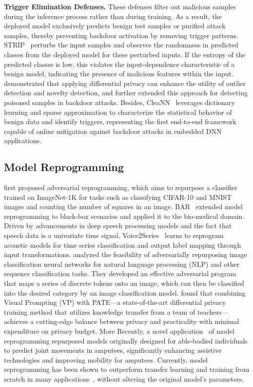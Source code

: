 \textbf{Trigger Elimination Defenses.}
These defenses filter out malicious samples during the inference process rather than during training. As a result, the deployed model exclusively predicts benign test samples or purified attack samples, thereby preventing backdoor activation by removing trigger patterns. STRIP~\citep{gao2019strip} perturbs the input samples and observes the randomness in predicted classes from the deployed model for these perturbed inputs. If the entropy of the predicted classes is low, this violates the input-dependence characteristic of a benign model, indicating the presence of malicious features within the input. \cite{du2020robust} demonstrated that applying differential privacy can enhance the utility of outlier detection and novelty detection, and further extended this approach for detecting poisoned samples in backdoor attacks. Besides, CleaNN~\citep{javaheripi2020cleann} leverages dictionary learning and sparse approximation to characterize the statistical behavior of benign data and identify triggers, representing the first end-to-end framework capable of online mitigation against backdoor attacks in embedded DNN applications.

\subsection{Model Reprogramming}

\citet{elsayed2019adversarial} first proposed adversarial reprogramming, which aims to repurpose a classifier trained on ImageNet-1K for tasks such as classifying CIFAR-10 and MNIST images and counting the number of squares in an image. BAR~\citep{tsai2020transfer} extended model reprogramming to black-box scenarios and applied it to the bio-medical domain. Driven by advancements in deep speech processing models and the fact that speech data is a univariate time signal, Voice2Series~\citep{yang2021voice2series} learns to reprogram acoustic models for time series classification and output label mapping through input transformations. \cite{neekhara2022cross} analyzed the feasibility of adversarially repurposing image classification neural networks for natural language processing (NLP) and other sequence classification tasks. They developed an effective adversarial program that maps a series of discrete tokens onto an image, which can then be classified into the desired category by an image classification model. \cite{li2023exploring} found that combining Visual Prompting (VP) with PATE—a state-of-the-art differential privacy training method that utilizes knowledge transfer from a team of teachers—achieves a cutting-edge balance between privacy and practicality with minimal expenditure on privacy budget. More Recently, a novel application~\citep{dey2024enhancing} of model reprogramming repurposed models originally designed for able-bodied individuals to predict joint movements in amputees, significantly enhancing assistive technologies and improving mobility for amputees. Currently, model reprogramming has been shown to outperform transfer learning and training from scratch in many applications~\citep{tsai2020transfer, yang2021voice2series, vinod2023reprogramming}, without altering the original model's parameters.


